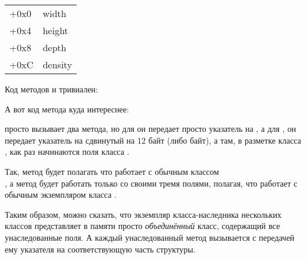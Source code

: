 \begin{center}
\begin{tabular}{ | l | l | }
\hline
  \tableheader{} \\
\hline
  +0x0 & width \\
\hline
  +0x4 & height \\
\hline
  +0x8 & depth \\
\hline
  +0xC & density \\
\hline
\end{tabular}
\end{center}

Код методов  и  тривиален:






А вот код метода  куда интереснее:




 просто вызывает два метода, но для  он передает просто указатель на , а для , он передает указатель на  сдвинутый на 12 байт (либо  байт), а там, 
в разметке класса , как раз начинаются поля класса .


Так, метод  будет полагать что работает с обычным классом \\
, а метод  будет работать только со своими тремя полями, полагая, 
что работает с обычным экземпляром класса .


Таким образом, можно сказать, что экземпляр класса-наследника нескольких классов представляет в памяти просто 
\emph{объединённый} класс, содержащий все унаследованные поля. А каждый унаследованный метод вызывается с передачей
ему указателя на соответствующую часть структуры.


